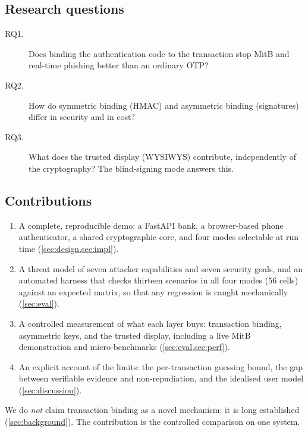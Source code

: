 \subsection{Research questions}
\begin{description}
  \item[RQ1.] Does binding the authentication code to the transaction stop MitB
    and real-time phishing better than an ordinary OTP?
  \item[RQ2.] How do symmetric binding (HMAC) and asymmetric binding
    (signatures) differ in security and in cost?
  \item[RQ3.] What does the trusted display (WYSIWYS) contribute, independently
    of the cryptography? The blind-signing mode answers this.
\end{description}

\subsection{Contributions}
\begin{enumerate}
  \item A complete, reproducible demo: a FastAPI bank, a browser-based phone
    authenticator, a shared cryptographic core, and four modes selectable at
    run time (\cref{sec:design,sec:impl}).
  \item A threat model of seven attacker capabilities and seven security goals,
    and an automated harness that checks thirteen scenarios in all four modes
    ($56$ cells) against an expected matrix, so that any regression is caught
    mechanically (\cref{sec:eval}).
  \item A controlled measurement of what each layer buys: transaction binding,
    asymmetric keys, and the trusted display, including a live MitB
    demonstration and micro-benchmarks (\cref{sec:eval,sec:perf}).
  \item An explicit account of the limits: the per-transaction guessing bound,
    the gap between verifiable evidence and non-repudiation, and the idealised
    user model (\cref{sec:discussion}).
\end{enumerate}
We do \emph{not} claim transaction binding as a novel mechanism; it is long
established (\cref{sec:background}). The contribution is the controlled
comparison on one system.
